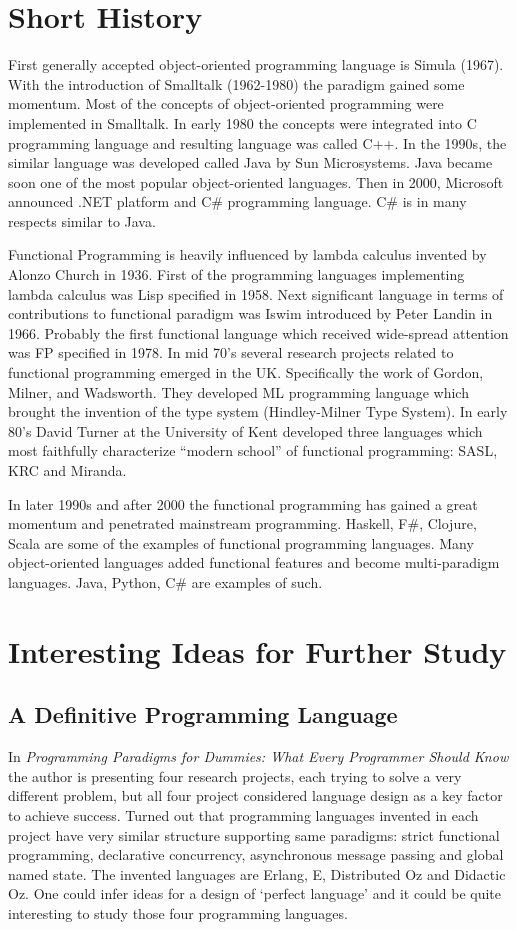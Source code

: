 \documentclass[12pt,twoside,a4paper]{report}
\begin{document}
\section{Short History}\label{2.4}
First generally accepted object-oriented programming language is Simula (1967). With the introduction of Smalltalk (1962-1980) the paradigm gained some momentum. Most of the concepts of object-oriented programming were implemented in Smalltalk. In early 1980 the concepts were integrated into C programming language and resulting language was called C++. In the 1990s, the similar language was developed called Java by Sun Microsystems. Java became soon one of the most popular object-oriented languages. Then in 2000, Microsoft announced .NET platform and C\# programming language. C\# is in many respects similar to Java. \cite{13}\par
Functional Programming is heavily influenced by lambda calculus invented by Alonzo Church in 1936. First of the programming languages implementing lambda calculus was Lisp specified in 1958. Next significant language in terms of contributions to functional paradigm was Iswim introduced by Peter Landin in 1966. Probably the first functional language which received wide-spread attention was FP specified in 1978. In mid 70’s several research projects related to functional programming emerged in the UK. Specifically the work of Gordon, Milner, and Wadsworth. They developed ML programming language which brought the invention of the type system (Hindley-Milner Type System). In early 80’s David Turner at the University of Kent developed three languages which most faithfully characterize “modern school” of functional programming: SASL, KRC and Miranda. \cite{12}\par
In later 1990s and after 2000 the functional programming has gained a great momentum and penetrated mainstream programming. Haskell, F\#, Clojure, Scala are some of the examples of functional programming languages. Many object-oriented languages added functional features and become multi-paradigm languages. Java, Python, C\# are examples of such.
\section{Interesting Ideas for Further Study}\label{2.5}
\subsection{A Definitive Programming Language}\label{2.5.1}
In \emph{Programming Paradigms for Dummies: What Every Programmer Should Know}\cite{16} the author is presenting four research projects, each trying to solve a very different problem, but all four project considered language design as a key factor to achieve success. Turned out that programming languages invented in each project have very similar structure supporting same paradigms: strict functional programming, declarative concurrency, asynchronous message passing and global named state. The invented languages are Erlang, E, Distributed Oz and Didactic Oz. One could infer ideas for a design of ‘perfect language’ and it could be quite interesting to study those four programming languages.
\end{document}
